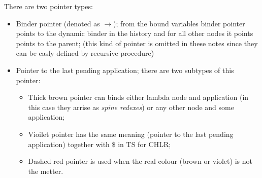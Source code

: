 \documentclass[a4paper, 10pt]{article}
\begin{document}
There are two pointer types:
\begin{itemize}
\item Binder pointer (denoted as {\color{green}$\rightarrow$});
  from the bound variables binder pointer points to the dynamic binder in the history
  and for all other nodes it points points to the parent;
  (this kind of pointer is omitted in these notes since they can
  be easly defined by recursive procedure)
\item Pointer to the last pending application; there are two subtypes
  of this pointer:
  \begin{itemize}
  \item Thick brown pointer can binds either
    lambda node and application (in this case they arrise as \emph{spine redexes})
    or any other node and some application;
  \item Vioilet pointer has the same meaning
    (pointer to the last pending application) together with $\$$
    in TS for CHLR;
  \item Dashed red pointer is used when the real colour
    (brown or violet) is not the metter.    
  \end{itemize}
\end{itemize}
\end{document}
